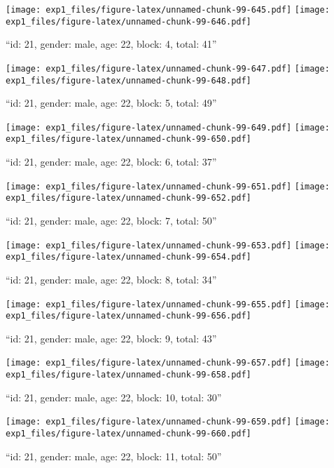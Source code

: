\documentclass[,]{article}
\begin{document}
\texttt{[image: exp1\_files/figure-latex/unnamed-chunk-99-645.pdf]}
\texttt{[image: exp1\_files/figure-latex/unnamed-chunk-99-646.pdf]}

\newpage
[1] 

``id: 21, gender: male, age: 22, block: 4, total: 41''

\texttt{[image: exp1\_files/figure-latex/unnamed-chunk-99-647.pdf]}
\texttt{[image: exp1\_files/figure-latex/unnamed-chunk-99-648.pdf]}

\newpage
[1] 

``id: 21, gender: male, age: 22, block: 5, total: 49''

\texttt{[image: exp1\_files/figure-latex/unnamed-chunk-99-649.pdf]}
\texttt{[image: exp1\_files/figure-latex/unnamed-chunk-99-650.pdf]}

\newpage
[1] 

``id: 21, gender: male, age: 22, block: 6, total: 37''

\texttt{[image: exp1\_files/figure-latex/unnamed-chunk-99-651.pdf]}
\texttt{[image: exp1\_files/figure-latex/unnamed-chunk-99-652.pdf]}

\newpage
[1] 

``id: 21, gender: male, age: 22, block: 7, total: 50''

\texttt{[image: exp1\_files/figure-latex/unnamed-chunk-99-653.pdf]}
\texttt{[image: exp1\_files/figure-latex/unnamed-chunk-99-654.pdf]}

\newpage
[1] 

``id: 21, gender: male, age: 22, block: 8, total: 34''

\texttt{[image: exp1\_files/figure-latex/unnamed-chunk-99-655.pdf]}
\texttt{[image: exp1\_files/figure-latex/unnamed-chunk-99-656.pdf]}

\newpage
[1] 

``id: 21, gender: male, age: 22, block: 9, total: 43''

\texttt{[image: exp1\_files/figure-latex/unnamed-chunk-99-657.pdf]}
\texttt{[image: exp1\_files/figure-latex/unnamed-chunk-99-658.pdf]}

\newpage
[1] 

``id: 21, gender: male, age: 22, block: 10, total: 30''

\texttt{[image: exp1\_files/figure-latex/unnamed-chunk-99-659.pdf]}
\texttt{[image: exp1\_files/figure-latex/unnamed-chunk-99-660.pdf]}

\newpage
[1] 

``id: 21, gender: male, age: 22, block: 11, total: 50''
\end{document}
